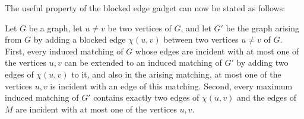 \documentclass[a4paper,UKenglish,cleveref, autoref, thm-restate]{lipics-v2021}
\begin{document}
The useful property of the blocked edge gadget can now be stated as follows:
\begin{lemma}\label{mim::lem:blocked-edges}
    Let $G$ be a graph, let $u \neq v$ be two vertices of $G$, and let $G'$ be the graph arising from $G$ by adding a blocked edge $\chi(u,v)$ between two vertices $u \neq v$ of $G$. First, every induced matching of $G$ whose edges are incident with at most one of the vertices $u, v$ can be extended to an induced matching of $G'$ by adding two edges of $\chi(u, v)$ to it, and also in the arising matching, at most one of the vertices $u, v$ is incident with an edge of this matching. 
    Second, every maximum induced matching of $G'$ contains exactly two edges of $\chi(u, v)$ and the edges of $M$ are incident with at most one of the vertices $u,v$.  
\end{lemma}
\end{document}
